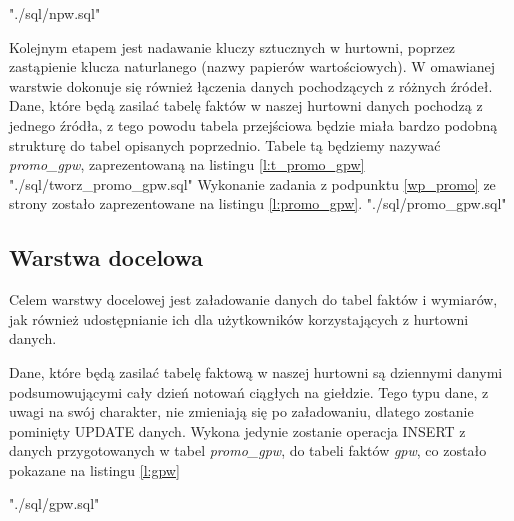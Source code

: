 {"./sql/npw.sql"}  

Kolejnym etapem jest nadawanie kluczy sztucznych w hurtowni,
 poprzez zastąpienie klucza naturlanego (nazwy papierów wartościowych).
W omawianej warstwie  dokonuje się również  łączenia danych pochodzących z różnych źródeł.
Dane, które będą zasilać tabelę faktów w naszej hurtowni danych pochodzą z jednego źródła, 
 z tego powodu tabela przejściowa będzie miała bardzo podobną strukturę do tabel opisanych poprzednio.
Tabele tą będziemy nazywać \textit{promo\_gpw}, zaprezentowaną na listingu \ref{l:t_promo_gpw}
 {"./sql/tworz_promo_gpw.sql"} 
Wykonanie zadania z podpunktu  \ref{wp_promo} ze strony \pageref{wp_promo} 
zostało zaprezentowane na listingu \ref{l:promo_gpw}.
 {"./sql/promo_gpw.sql"} 



\subsection{Warstwa docelowa} \label{warstwa_docelowa}
Celem warstwy docelowej jest załadowanie danych do tabel faktów i wymiarów,
 jak również udostępnianie ich dla użytkowników korzystających z hurtowni danych.

Dane, które będą zasilać tabelę faktową w naszej hurtowni są dziennymi danymi podsumowującymi cały dzień notowań ciągłych na giełdzie. 
Tego typu dane, 
 z uwagi na swój charakter,
 nie zmieniają się po załadowaniu,
 dlatego zostanie pominięty UPDATE danych. 
Wykona jedynie zostanie operacja INSERT z danych 
 przygotowanych w tabel \textit{promo\_gpw}, do tabeli faktów \textit{gpw}, 
 co zostało pokazane na listingu \ref{l:gpw}

 {"./sql/gpw.sql"} 


